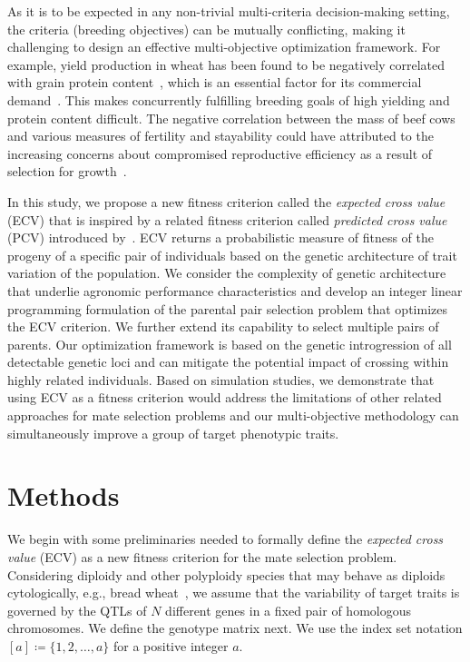 \documentclass[12pt, a4paper, bibliography=totoc]{scrartcl}
\begin{document}
As it is to be expected in any non-trivial multi-criteria decision-making setting, the criteria (breeding objectives) can be mutually conflicting, making it challenging to design an effective multi-objective optimization framework. For example, yield production in wheat has been found to be negatively correlated with grain protein content~\citep{simmonds1995relation}, which is an essential factor for its commercial demand~\citep{visscher1996marker}. This makes concurrently fulfilling breeding goals of high yielding and protein content difficult. The negative correlation between the mass of beef cows and various measures of fertility and stayability could have attributed to the increasing concerns about compromised reproductive efficiency as a result of selection for growth~\citep{berry2014genetics, mwansa2002multiple}.


In this study, we propose a new fitness criterion called the \textit{expected cross value} (ECV) that is inspired by a related fitness criterion called \textit{predicted cross value} (PCV) introduced by~\cite{han2017predicted}. ECV returns a probabilistic measure of fitness of the progeny of a specific pair of individuals based on the genetic architecture of trait variation of the population. We consider the complexity of genetic architecture that underlie agronomic performance characteristics and develop an integer linear programming formulation of the parental pair selection problem that optimizes the ECV criterion. We further extend its capability to select multiple  pairs of parents. Our optimization framework is based on the genetic introgression of all detectable genetic loci and can mitigate the potential impact of crossing within highly related individuals. Based on simulation studies, we demonstrate that using ECV as a fitness criterion would address the limitations of other related approaches for mate selection problems and our multi-objective  methodology can simultaneously improve a group of target phenotypic traits. 

\section*{Methods}\label{sec:methods}

We begin with some preliminaries needed to formally define the \textit{expected cross value} (ECV)  as a new fitness criterion for the mate selection problem. Considering diploidy and other polyploidy species that may behave as diploids cytologically, e.g.,  bread wheat~\citep{riley1958genetic}, we assume that the variability of target traits is governed by the QTLs of $N$ different genes in a fixed pair of homologous chromosomes. We define the genotype matrix next. We use the index set notation $[a] \coloneqq \{1,2,\ldots,a\}$ for a positive integer $a$. 
\end{document}
